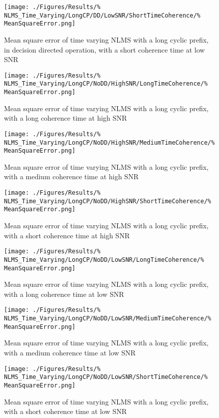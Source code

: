 \begin{figure}[ht]
	\texttt{[image: ./Figures/Results/\%
NLMS\_Time\_Varying/LongCP/DD/LowSNR/ShortTimeCoherence/\%
MeanSquareError.png]}
	\caption{Mean square error of time varying NLMS with a 
	long cyclic prefix, in decision directed operation, with a 
	short coherence time at low SNR}
\end{figure}
\begin{figure}[ht]
	\texttt{[image: ./Figures/Results/\%
NLMS\_Time\_Varying/LongCP/NoDD/HighSNR/LongTimeCoherence/\%
MeanSquareError.png]}
	\caption{Mean square error of time varying NLMS with a 
	long cyclic prefix, with a long coherence time at high SNR}
\end{figure}
\begin{figure}[ht]
	\texttt{[image: ./Figures/Results/\%
NLMS\_Time\_Varying/LongCP/NoDD/HighSNR/MediumTimeCoherence/\%
MeanSquareError.png]}
	\caption{Mean square error of time varying NLMS with a 
	long cyclic prefix, with a medium coherence time at high SNR}
\end{figure}
\begin{figure}[ht]
	\texttt{[image: ./Figures/Results/\%
NLMS\_Time\_Varying/LongCP/NoDD/HighSNR/ShortTimeCoherence/\%
MeanSquareError.png]}
	\caption{Mean square error of time varying NLMS with a 
	long cyclic prefix, with a short coherence time at high SNR}
\end{figure}
\begin{figure}[ht]
	\texttt{[image: ./Figures/Results/\%
NLMS\_Time\_Varying/LongCP/NoDD/LowSNR/LongTimeCoherence/\%
MeanSquareError.png]}
	\caption{Mean square error of time varying NLMS with a 
	long cyclic prefix, with a long coherence time at low SNR}
	\label{fig:NLMS-Long-Low-None-Long}
\end{figure}
\begin{figure}[ht]
	\texttt{[image: ./Figures/Results/\%
NLMS\_Time\_Varying/LongCP/NoDD/LowSNR/MediumTimeCoherence/\%
MeanSquareError.png]}
	\caption{Mean square error of time varying NLMS with a 
	long cyclic prefix, with a medium coherence time at low SNR}
\end{figure}
\begin{figure}[ht]
	\texttt{[image: ./Figures/Results/\%
NLMS\_Time\_Varying/LongCP/NoDD/LowSNR/ShortTimeCoherence/\%
MeanSquareError.png]}
	\caption{Mean square error of time varying NLMS with a 
	long cyclic prefix, with a short coherence time at low SNR}
\end{figure}
